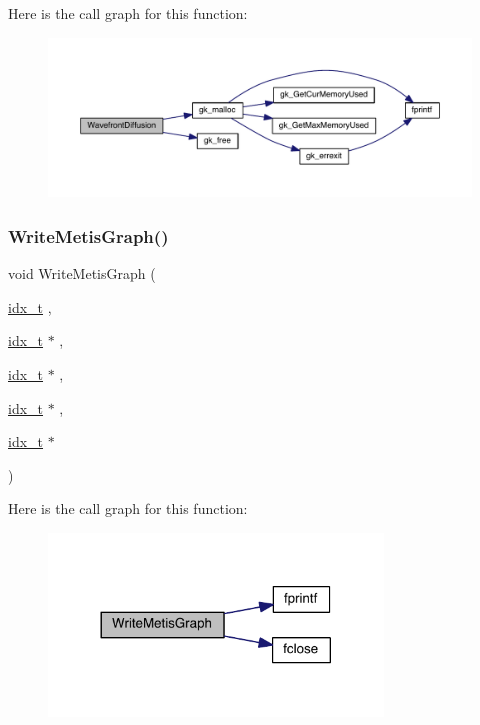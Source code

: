 Here is the call graph for this function\+:\nopagebreak
\begin{figure}[H]
\begin{center}
\leavevmode
\includegraphics[width=350pt]{a00951_a329e16e0cbd86f11856a1c8f24badaca_cgraph}
\end{center}
\end{figure}
\mbox{\label{a00951_aafc2084e9609b52bdc6c05ad538196db}} 
\subsubsection{\texorpdfstring{Write\+Metis\+Graph()}{WriteMetisGraph()}}
{\footnotesize\ttfamily void Write\+Metis\+Graph (\begin{DoxyParamCaption}\item[{\hyperlink{a00876_aaa5262be3e700770163401acb0150f52}{idx\+\_\+t}}]{,  }\item[{\hyperlink{a00876_aaa5262be3e700770163401acb0150f52}{idx\+\_\+t} $\ast$}]{,  }\item[{\hyperlink{a00876_aaa5262be3e700770163401acb0150f52}{idx\+\_\+t} $\ast$}]{,  }\item[{\hyperlink{a00876_aaa5262be3e700770163401acb0150f52}{idx\+\_\+t} $\ast$}]{,  }\item[{\hyperlink{a00876_aaa5262be3e700770163401acb0150f52}{idx\+\_\+t} $\ast$}]{ }\end{DoxyParamCaption})}

Here is the call graph for this function\+:\nopagebreak
\begin{figure}[H]
\begin{center}
\leavevmode
\includegraphics[width=252pt]{a00951_aafc2084e9609b52bdc6c05ad538196db_cgraph}
\end{center}
\end{figure}
\mbox{\label{a00951_a555f2ae3f4e5561c9b1ef592bf0f8476}} 
